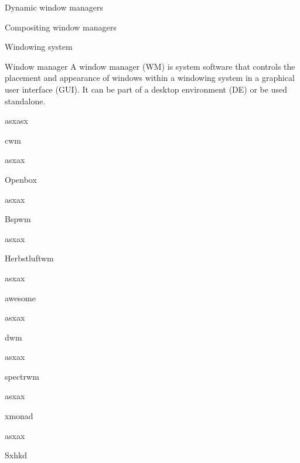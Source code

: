 \secc Dynamic window managers

\secc Compositing window managers

\sec Windowing system

\sec Window manager
A window manager (WM) is system software that controls the placement and appearance of windows within a windowing system in a graphical user interface (GUI). It can be part of a desktop environment (DE) or be used standalone.



asxasx



\secc cwm

asxax

\secc Openbox

asxax

\secc Bspwm

asxax

\secc Herbstluftwm

asxax

\secc awesome

asxax

\secc dwm

asxax

\secc spectrwm

asxax

\secc xmonad

asxax

\secc Sxhkd




